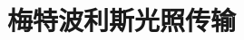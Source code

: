        
\label{chp:intro}
%

\label{chp:hardware}
%
	
\label{chp:pipeline}
%

\label{chp:shading}
%

\label{chp:mc}
%

\label{chp:path-tracing}
%

\label{chp:pm}
%

\setcounter{chapter}{8}
\chapter{梅特波利斯光照传输}
\label{chp:mlt}
\minitoc


\label{chp:rad}
%

\label{chp:ir}
%

